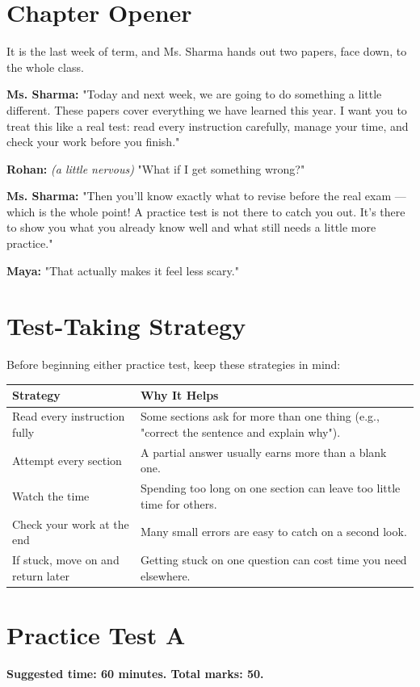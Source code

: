 \section{Chapter Opener}
It is the last week of term, and Ms. Sharma hands out two papers, face down, to the whole class.

\textbf{Ms. Sharma:} "Today and next week, we are going to do something a little different. These papers cover everything we have learned this year. I want you to treat this like a real test: read every instruction carefully, manage your time, and check your work before you finish."

\textbf{Rohan:} \textit{(a little nervous)} "What if I get something wrong?"

\textbf{Ms. Sharma:} "Then you'll know exactly what to revise before the real exam — which is the whole point! A practice test is not there to catch you out. It's there to show you what you already know well and what still needs a little more practice."

\textbf{Maya:} "That actually makes it feel less scary."

\section{Test-Taking Strategy}
Before beginning either practice test, keep these strategies in mind:

\begin{table}[h!]
\centering
\begin{tabular}{|l|p{8cm}|}
\hline
\textbf{Strategy} & \textbf{Why It Helps} \\
\hline
Read every instruction fully & Some sections ask for more than one thing (e.g., "correct the sentence and explain why"). \\
Attempt every section & A partial answer usually earns more than a blank one. \\
Watch the time & Spending too long on one section can leave too little time for others. \\
Check your work at the end & Many small errors are easy to catch on a second look. \\
If stuck, move on and return later & Getting stuck on one question can cost time you need elsewhere. \\
\hline
\end{tabular}
\end{table}

\section{Practice Test A}
\textbf{Suggested time: 60 minutes. Total marks: 50.}

